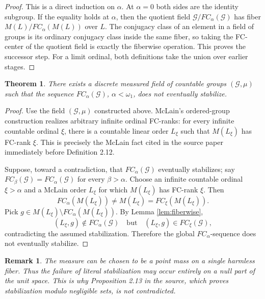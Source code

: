 \documentclass[11pt]{amsart}
\newtheorem{theorem}{Theorem}
\newtheorem{remark}{Remark}
\newcommand{\cG}{\mathcal G}
\begin{document}
\begin{proof}
This is a direct induction on \(\alpha\).  At \(\alpha=0\) both sides are the
identity subgroup.  If the equality holds at \(\alpha\), then the quotient
field \(\cG/FC_\alpha(\cG)\) has fiber \(M(L)/FC_\alpha(M(L))\) over \(L\).
The conjugacy class of an element in a field of groups is its ordinary
conjugacy class inside the same fiber, so taking the FC-center of the quotient
field is exactly the fiberwise operation.  This proves the successor step.
For a limit ordinal, both definitions take the union over earlier stages.
\end{proof}

\begin{theorem}\label{thm:counterexample}
There exists a discrete measured field of countable groups \((\cG,\mu)\) such
that the sequence \(FC_\alpha(\cG)\), \(\alpha<\omega_1\), does not eventually
stabilize.
\end{theorem}

\begin{proof}
Use the field \((\cG,\mu)\) constructed above.  McLain's ordered-group
construction realizes arbitrary infinite ordinal FC-ranks: for every infinite
countable ordinal \(\xi\), there is a countable linear order \(L_\xi\) such
that \(M(L_\xi)\) has FC-rank \(\xi\).  This is precisely the McLain fact
cited in the source paper immediately before Definition 2.12.

Suppose, toward a contradiction, that \(FC_\alpha(\cG)\) eventually stabilizes;
say \(FC_\beta(\cG)=FC_\alpha(\cG)\) for every \(\beta>\alpha\).  Choose an
infinite countable ordinal \(\xi>\alpha\) and a McLain order \(L_\xi\) for
which \(M(L_\xi)\) has FC-rank \(\xi\).  Then
\[
  FC_\alpha(M(L_\xi))\neq M(L_\xi)=FC_\xi(M(L_\xi)).
\]
Pick \(g\in M(L_\xi)\setminus FC_\alpha(M(L_\xi))\).  By Lemma
\ref{lem:fiberwise},
\[
  (L_\xi,g)\notin FC_\alpha(\cG)
  \quad\text{but}\quad
  (L_\xi,g)\in FC_\xi(\cG),
\]
contradicting the assumed stabilization.  Therefore the global
\(FC_\alpha\)-sequence does not eventually stabilize.
\end{proof}

\begin{remark}
The measure can be chosen to be a point mass on a single harmless fiber.  Thus
the failure of literal stabilization may occur entirely on a null part of the
unit space.  This is why Proposition 2.13 in the source, which proves
stabilization modulo negligible sets, is not contradicted.
\end{remark}
\end{document}
